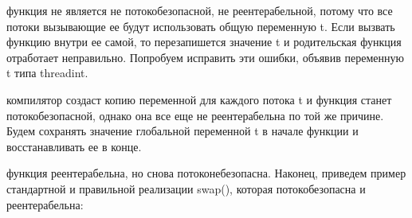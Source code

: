 {\begin{figure}[H]
	\end{figure}
	 функция не является не потокобезопасной, не реентерабельной, потому что все потоки вызывающие ее будут использовать общую переменную t. Если вызвать функцию внутри ее самой, то перезапишется значение t и родительская функция отработает неправильно. Попробуем исправить эти ошибки, объявив переменную t типа \textunderscore \textunderscore threadint.
	\begin{figure}[H]
		
	\end{figure}
	 компилятор создаст копию переменной для каждого потока t и функция станет потокобезопасной, однако она все еще не реентерабельна по той же причине. Будем сохранять значение глобальной переменной t в начале функции и восстанавливать ее в конце.
	\begin{figure}[H]
		
	\end{figure}
	 функция реентерабельна, но снова потоконебезопасна. Наконец, приведем пример стандартной и правильной реализации swap(), которая потокобезопасна и реентерабельна:
	\begin{figure}[H]
		
	\end{figure}
}
